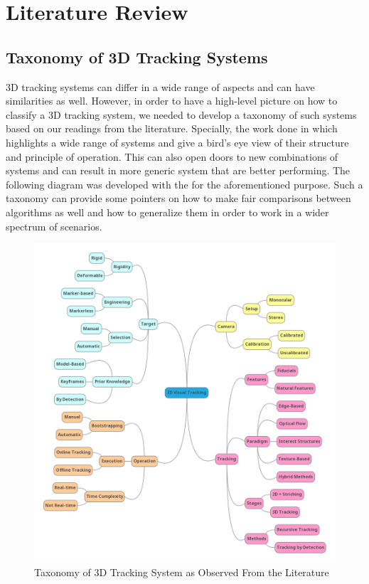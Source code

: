 \documentclass{article}
\begin{document}
\section{Literature Review}
\newpage
\subsection{Taxonomy of 3D Tracking Systems}
3D tracking systems can differ in a wide range of aspects and can have similarities as well. However, in order to have a high-level picture on how to classify a 3D tracking system, we needed to develop a taxonomy of such systems based on our readings from the literature. Specially, the work done in \cite{lepetit2005monocular} which highlights a wide range of systems and give a bird's eye view of their structure and principle of operation. This can also open doors to new combinations of systems and can result in more generic system that are better performing. The following diagram was developed with the for the aforementioned purpose. Such a taxonomy can provide some pointers on how to make fair comparisons between algorithms as well and how to generalize them in order to work in a wider spectrum of scenarios.
\begin{figure}[H]
\centering
\includegraphics[width=\textwidth]{taxonomy.png}
\caption{Taxonomy of 3D Tracking System as Observed From the Literature}
\end{figure}
\newpage
\end{document}
